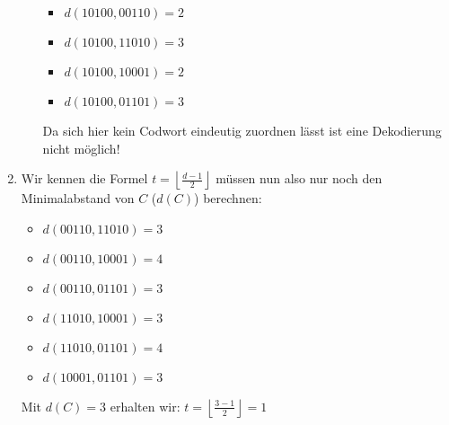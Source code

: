 \begin{aufgabe}[Codes][4]
\begin{enumerate}[label=\alph*)]
\begin{itemize}[label=--]
        \begin{multicols}{2}
            \begin{itemize}[label=]\narrowitems
                \item \(d(10100, 00110) = 2\)
                \item \(d(10100, 11010) = 3\)
                \item \(d(10100, 10001) = 2\)
                \item \(d(10100, 01101) = 3\)
            \end{itemize}
        \end{multicols}
        Da sich hier kein Codwort eindeutig zuordnen lässt ist eine Dekodierung nicht möglich!
    \end{itemize}
    \item Wir kennen die Formel \(t = \left\lfloor \frac{d-1}{2}\right\rfloor \) müssen nun also nur noch den Minimalabstand von $C$ ($d(C)$) berechnen: 
    \begin{multicols}{3}
        \begin{itemize}[label=]\narrowitems
            \item \(d(00110, 11010) = 3\)
            \item \(d(00110, 10001) = 4\)
            \item \(d(00110, 01101) = 3\)
            \item \(d(11010, 10001) = 3\)
            \item \(d(11010, 01101) = 4\)
            \item \(d(10001, 01101) = 3\)
        \end{itemize}
    \end{multicols}
    Mit $d(C) = 3$ erhalten wir: \(t = \left\lfloor \frac{3-1}{2}\right\rfloor = 1\)
\end{enumerate}
\end{aufgabe}
\newpage

